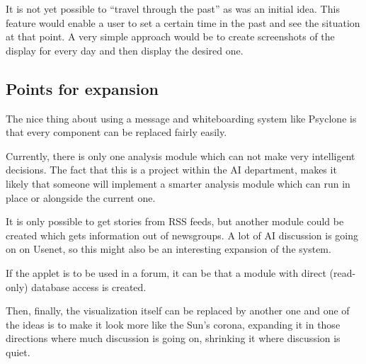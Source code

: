 It is not yet possible to ``travel through the past'' as was an initial
idea. This feature would enable a user to set a certain time in the past
and see the situation at that point. A very simple approach would be to
create screenshots of the display for every day and then display the
desired one.

\subsection{Points for expansion}

The nice thing about using a message and whiteboarding system like
Psyclone is that every component can be replaced fairly easily.

Currently, there is only one analysis module which can not make very
intelligent decisions. The fact that this is a project within the AI
department, makes it likely that someone will implement a smarter analysis
module which can run in place or alongside the current one.

It is only possible to get stories from RSS feeds, but another module
could be created which gets information out of newsgroups. A lot of
AI discussion is going on on Usenet, so this might also be an interesting
expansion of the system.

If the applet is to be used in a forum, it can be that a module with
direct (read-only) database access is created.

Then, finally, the visualization itself can be replaced by another one and
one of the ideas is to make it look more like the Sun's corona, expanding
it in those directions where much discussion is going on, shrinking it
where discussion is quiet.
